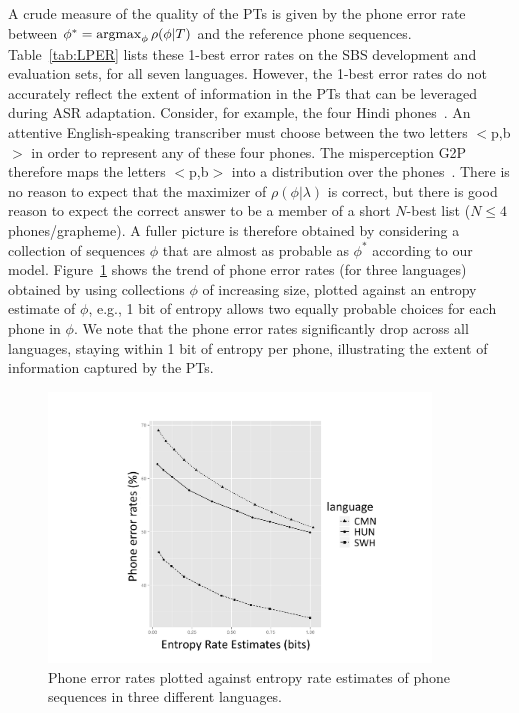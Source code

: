 A crude measure of the quality of the PTs is given by the phone error
rate between $\phi^* = \operatorname*{argmax}_{\phi} \rho(\phi|T)$ and the reference
phone sequences. Table~\ref{tab:LPER} lists these 1-best error rates
on the SBS development and evaluation sets, for all seven
languages. However, the 1-best error rates do not accurately reflect
the extent of information in the PTs that can be leveraged during ASR
adaptation.  Consider, for example, the four Hindi
phones~\ipa{[p,p\textsuperscript{h},b,\"*b]}.  An attentive
English-speaking transcriber must choose between the two letters
$<$p,b$>$ in order to represent any of these four phones.  The
misperception G2P therefore maps the letters $<$p,b$>$ into a
distribution over the phones~\ipa{[p,p\textsuperscript{h},b,\"*b]}.
There is no reason to expect that the maximizer of
$\rho(\phi|\lambda)$ is correct, but there is good reason to expect
the correct answer to be a member of a short $N$-best list ($N\le 4$
phones/grapheme).  A fuller picture is therefore obtained by
considering a collection of sequences $\phi$ that are almost as
probable as $\phi^*$ according to our model. Figure~\ref{fig:listPER}
shows the trend of phone error rates (for three languages) obtained by
using collections $\phi$ of increasing size, plotted against an
entropy estimate of $\phi$, e.g., 1 bit of entropy allows two equally
probable choices for each phone in $\phi$. We note that the phone
error rates significantly drop across all languages, staying within 1
bit of entropy per phone, illustrating the extent of information
captured by the PTs.

\begin{figure}[t!]
\begin{center}
\includegraphics[width=4in]{../figs/ptperfigure.pdf}
\end{center}
\caption{Phone error rates plotted against entropy rate estimates of phone sequences in three different languages.}
\label{fig:listPER}
\end{figure}
